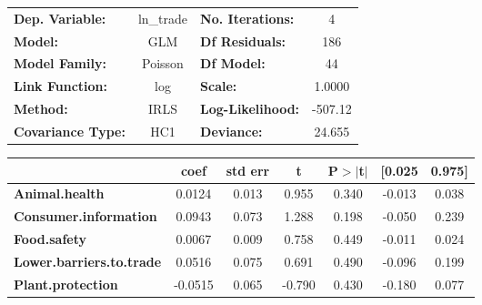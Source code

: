 \begin{center}
\begin{tabular}{lclc}
\toprule
\textbf{Dep. Variable:}                                            &   ln\_trade   & \textbf{  No. Iterations:    } &     4       \\
\textbf{Model:}                                                    &      GLM      & \textbf{  Df Residuals:      } &    186      \\
\textbf{Model Family:}                                             &    Poisson    & \textbf{  Df Model:          } &     44      \\
\textbf{Link Function:}                                            &      log      & \textbf{  Scale:             } &    1.0000   \\
\textbf{Method:}                                                   &      IRLS     & \textbf{  Log-Likelihood:    } &   -507.12   \\
\textbf{Covariance Type:}                                          &      HC1      & \textbf{  Deviance:          } &    24.655   \\
\bottomrule
\end{tabular}
\begin{tabular}{lcccccc}
                                                                   & \textbf{coef} & \textbf{std err} & \textbf{t} & \textbf{P$> |$t$|$} & \textbf{[0.025} & \textbf{0.975]}  \\
\midrule
\textbf{Animal.health}                                             &       0.0124  &        0.013     &     0.955  &         0.340        &       -0.013    &        0.038     \\
\textbf{Consumer.information}                                      &       0.0943  &        0.073     &     1.288  &         0.198        &       -0.050    &        0.239     \\
\textbf{Food.safety}                                               &       0.0067  &        0.009     &     0.758  &         0.449        &       -0.011    &        0.024     \\
\textbf{Lower.barriers.to.trade}                                   &       0.0516  &        0.075     &     0.691  &         0.490        &       -0.096    &        0.199     \\
\textbf{Plant.protection}                                          &      -0.0515  &        0.065     &    -0.790  &         0.430        &       -0.180    &        0.077     \\

\end{tabular}
\end{center}
